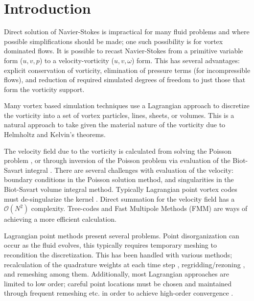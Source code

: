 \documentclass[]{aiaa-tc}%
\begin{document}
\section{Introduction}
Direct solution of Navier-Stokes is impractical for many fluid problems and where possible simplifications should be made; one such possibility is for vortex dominated flows. It is possible to recast Navier-Stokes from a primitive variable form ($u,v,p$) to a velocity-vorticity ($u,v,\omega$) form. This has several advantages: explicit conservation of vorticity, elimination of pressure terms (for incompressible flows), and reduction of required simulated degrees of freedom to just those that form the vorticity support.

Many vortex based simulation techniques use a Lagrangian approach to discretize the vorticity into a set of vortex particles\cite{Point4}, lines\cite{Line4}, sheets\cite{Sheet1}, or volumes\cite{Volume1}. This is a natural approach to take given the material nature of the vorticity due to Helmholtz and Kelvin's theorems.

The velocity field due to the vorticity is calculated from solving the Poisson problem \cite{MiscMeth1}, or through inversion of the Poisson problem via evaluation of the Biot-Savart integral \cite{Saffman1992}. There are several challenges with evaluation of the velocity: boundary conditions in the Poisson solution method, and singularities in the Biot-Savart volume integral method. Typically Lagrangian point vortex codes must de-singularize the kernel \cite{Rosenhead1930,Moore1972}. Direct summation for the velocity field has a $\mathcal{O}(N^2)$ complexity. Tree-codes \cite{LindsayKrasny2001} and Fast Multipole Methods (FMM) \cite{Strain1997} are ways of achieving a more efficient calculation.

Lagrangian point methods present several problems. Point disorganization can occur as the fluid evolves, this typically requires temporary meshing to recondition the discretization. This has been handled with various methods; recalculation of the quadrature weights at each time step \cite{Remesh2,Remesh3}, regridding/rezoning \cite{Remesh4}, and remeshing \cite{Remesh5} among them. Additionally, most Lagrangian approaches are limited to low order; careful point locations must be chosen and maintained through frequent remeshing etc. in order to achieve high-order convergence \cite{Strain1997}.
\end{document}
